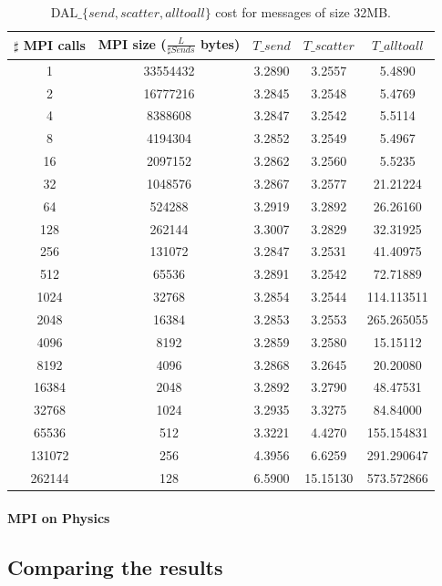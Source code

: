 \begin{table}[h]
\begin{center}
\begin{tabular}{|c|c|c|c|c|}\hline
\hline
$\sharp$ MPI calls & MPI size ($\frac{L}{\sharp Sends}$ bytes)  & $T\_send$   & $T\_scatter$  & $T\_alltoall$      \\\hline\hline
1 & 33554432 & 3.2890 & 3.2557 & 5.4890 \\\hline
2 & 16777216 & 3.2845 & 3.2548 & 5.4769 \\\hline
4 & 8388608 & 3.2847 & 3.2542 & 5.5114 \\\hline
8 & 4194304 & 3.2852 & 3.2549 & 5.4967 \\\hline
16 & 2097152 & 3.2862 & 3.2560 & 5.5235 \\\hline
32 & 1048576 & 3.2867 & 3.2577 & 21.21224 \\\hline
64 & 524288 & 3.2919 & 3.2892 & 26.26160 \\\hline
128 & 262144 & 3.3007 & 3.2829 & 32.31925 \\\hline
256 & 131072 & 3.2847 & 3.2531 & 41.40975 \\\hline
512 & 65536 & 3.2891 & 3.2542 & 72.71889 \\\hline
1024 & 32768 & 3.2854 & 3.2544 & 114.113511 \\\hline
2048 & 16384 & 3.2853 & 3.2553 & 265.265055 \\\hline
4096 & 8192 & 3.2859 & 3.2580 & 15.15112 \\\hline
8192 & 4096 & 3.2868 & 3.2645 & 20.20080 \\\hline
16384 & 2048 & 3.2892 & 3.2790 & 48.47531 \\\hline
32768 & 1024 & 3.2935 & 3.3275 & 84.84000 \\\hline
65536 & 512 & 3.3221 & 4.4270 & 155.154831 \\\hline
131072 & 256 & 4.3956 & 6.6259 & 291.290647 \\\hline
262144 & 128 & 6.5900 & 15.15130 & 573.572866 \\\hline
\end{tabular}
\caption{DAL$\_\lbrace send, scatter, alltoall \rbrace$ cost for messages of size 32MB. }
\label{tsetup-impact}
\end{center}
\end{table}


\paragraph{MPI on Physics}




\subsection{Comparing the results}